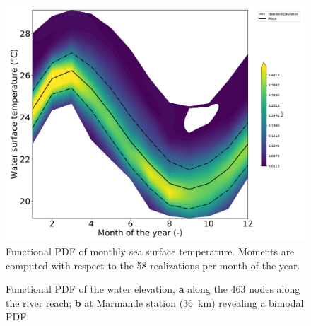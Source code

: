 \begin{figure}[!ht]
\centering
\includegraphics[width=0.8\linewidth,keepaspectratio]{fig/contributions/visu/pdf.pdf}
\caption{Functional PDF of monthly sea surface temperature. Moments are computed with respect to the 58 realizations per month of the year.}
\label{fig:pdf}
\end{figure}

\begin{figure}[!ht]               
\centering
{}
\caption{Functional PDF of the water elevation, \textbf{a} along the 463 nodes along the river reach; \textbf{b} at Marmande station (36~km) revealing a bimodal PDF.}
\label{fig:pdf_MASCARET}
\end{figure}

